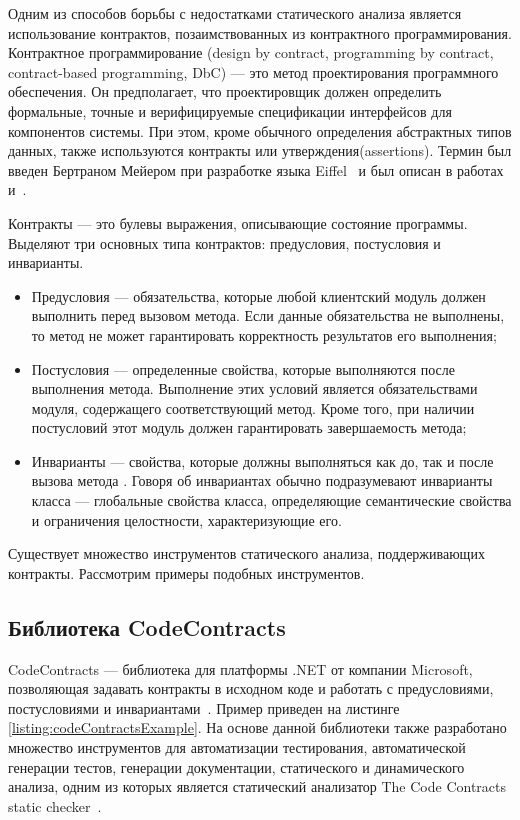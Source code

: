 Одним из способов борьбы с недостатками статического анализа является использование контрактов, позаимствованных из контрактного программирования. Контрактное программирование (design by contract, programming by contract, contract-based programming, DbC) --- это метод проектирования программного обеспечения. Он предполагает, что проектировщик должен определить формальные, точные и верифицируемые спецификации интерфейсов для компонентов системы. При этом, кроме обычного определения абстрактных типов данных, также используются контракты или утверждения(assertions). Термин был введен Бертраном Мейером при разработке языка Eiffel~\cite{eiffel} и был описан в работах~\cite{designByContract} и~\cite{oosc-meyer}.

Контракты --- это булевы выражения, описывающие состояние программы. Выделяют три основных типа контрактов: предусловия, постусловия и инварианты.
\begin{itemize}
\item Предусловия --- обязательства, которые любой клиентский модуль должен выполнить перед вызовом метода. Если данные обязательства не выполнены, то метод не может гарантировать корректность результатов его выполнения;

\item Постусловия --- определенные свойства, которые выполняются после выполнения метода. Выполнение этих условий является обязательствами модуля, содержащего соответствующий метод. Кроме того, при наличии постусловий этот модуль должен гарантировать завершаемость метода;

\item Инварианты --- свойства, которые должны выполняться как до, так и после вызова метода . Говоря об инвариантах обычно подразумевают инварианты класса --- глобальные свойства класса, определяющие семантические свойства и ограничения целостности, характеризующие его.
\end{itemize}

Существует множество инструментов статического анализа, поддерживающих контракты. Рассмотрим примеры подобных инструментов.

\subsection{Библиотека CodeContracts}
CodeContracts --- библиотека для платформы .NET от компании Microsoft, позволяющая задавать контракты в исходном коде и работать с предусловиями, постусловиями и инвариантами~\cite{codeContracts}. Пример приведен на листинге \ref{listing:codeContractsExample}. На основе данной библиотеки также разработано множество инструментов для автоматизации тестирования, автоматической генерации тестов, генерации документации, статического и динамического анализа, одним из которых является статический анализатор The Code Contracts static checker~\cite{cccheck}.



